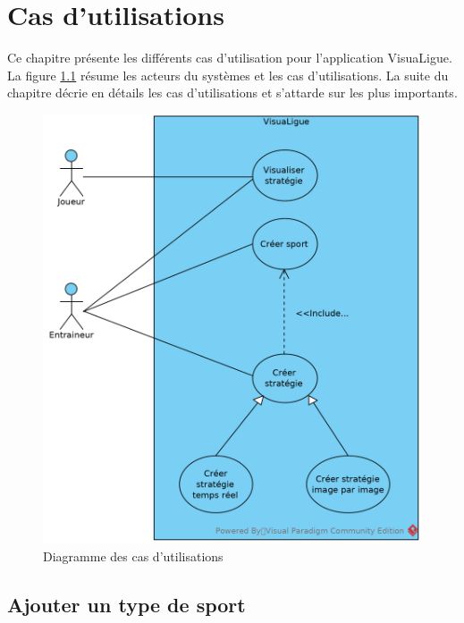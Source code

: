 
\chapter{Cas d'utilisations}
\label{s:cas_utilisation}

Ce chapitre présente les différents cas d'utilisation pour l'application VisuaLigue.
La figure \ref{fig:cas_utilisation_diag} résume les acteurs du systèmes et les cas d'utilisations.
La suite du chapitre décrie en détails les cas d'utilisations et s'attarde sur les plus importants.

\begin{figure}[htpb]
    \centering
    \includegraphics[scale=0.7]{fig/cas_utilisation_diag.png}
    \caption{Diagramme des cas d'utilisations}
    \label{fig:cas_utilisation_diag}
\end{figure}

\newpage



\section{Ajouter un type de sport}
\label{sec:ajouter_un_type_de_sport}

